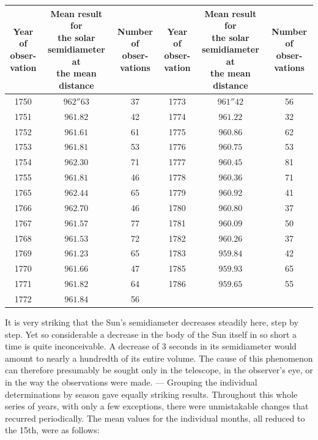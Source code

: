 \begin{center}\small
\setlength{\tabcolsep}{3pt}
\begin{tabular}{c|c|c||c|c|c}
\shortstack{Year of\\obser-\\vation}&\shortstack{Mean result for\\the solar\\semidiameter at\\the mean\\distance}&\shortstack{Number of\\obser-\\vations}&\shortstack{Year of\\obser-\\vation}&\shortstack{Mean result for\\the solar\\semidiameter at\\the mean\\distance}&\shortstack{Number of\\obser-\\vations}\\ \hline
1750 & $962''63$ & 37 & 1773 & $961''42$ & 56 \\
1751 & $961.82$ & 42 & 1774 & $961.22$ & 32 \\
1752 & $961.61$ & 61 & 1775 & $960.86$ & 62 \\
1753 & $961.81$ & 53 & 1776 & $960.75$ & 53 \\
1754 & $962.30$ & 71 & 1777 & $960.45$ & 81 \\
1755 & $961.81$ & 46 & 1778 & $960.36$ & 71 \\
1765 & $962.44$ & 65 & 1779 & $960.92$ & 41 \\
1766 & $962.70$ & 46 & 1780 & $960.80$ & 37 \\
1767 & $961.57$ & 77 & 1781 & $960.09$ & 50 \\
1768 & $961.53$ & 72 & 1782 & $960.26$ & 37 \\
1769 & $961.23$ & 65 & 1783 & $959.84$ & 42 \\
1770 & $961.66$ & 47 & 1785 & $959.93$ & 65 \\
1771 & $961.82$ & 64 & 1786 & $959.65$ & 55 \\
1772 & $961.84$ & 56 & & & \\
\end{tabular}\end{center}

It is very striking that the Sun’s semidiameter decreases steadily here, step by step. Yet so considerable a decrease in the body of the Sun itself in so short a time is quite inconceivable. A decrease of 3 seconds in its semidiameter would amount to nearly a hundredth of its entire volume. The cause of this phenomenon can therefore presumably be sought only in the telescope, in the observer’s eye, or in the way the observations were made. — Grouping the individual determinations by season gave equally striking results. Throughout this whole series of years, with only a few exceptions, there were unmistakable changes that recurred periodically. The mean values for the individual months, all reduced to the 15th, were as follows:

